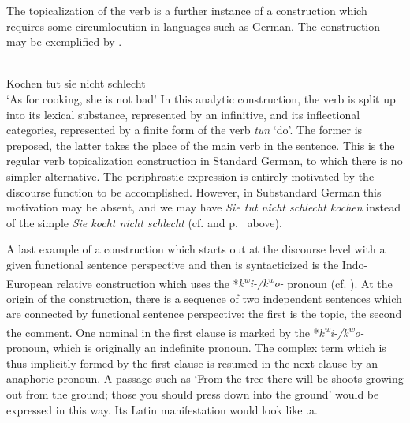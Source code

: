 The topicalization of the verb is a further instance of a construction which requires some circumlocution in languages such as German. The construction may be exemplified by .

\ea \label{ex:E95}
\langinfo{\LangGerm}\\
 Kochen tut sie nicht schlecht\\
\glt ‘As for cooking, she is not bad’
\z
\noindent In this analytic construction, the verb is split up into its lexical substance, represented by an infinitive, and its inflectional categories, represented by a finite form of the verb \textit{tun} ‘do’. The former is preposed, the latter takes the place of the main verb in the sentence. This is the regular verb topicalization construction in Standard German, to which there is no simpler alternative. The periphrastic expression is entirely motivated by the discourse function to be accomplished.\label{page123} However, in Substandard German this motivation may be absent, and we may have \textit{Sie tut nicht schlecht kochen} instead of the simple \textit{Sie kocht nicht schlecht} (cf. \citealt[156]{Ronneberger-Sibold1980} and p.~\pageref{page35}\chk%
  above).

A last example of a construction which starts out at the discourse level with a given functional sentence perspective and then is syntacticized is the Indo-European relative construction which uses the *\textit{k}\textit{\textsuperscript{w}}\textit{i-/k}\textit{\textsuperscript{w}}\textit{o-} pronoun (cf. \citealt[Ch. \textsc{vi}.1]{Lehmann1984}). At the origin of the construction, there is a sequence of two independent sentences which are connected by functional sentence perspective: the first is the topic, the second the comment. One nominal in the first clause is marked by the *\textit{k}\textit{\textsuperscript{w}}\textit{i-/k}\textit{\textsuperscript{w}}\textit{o-} pronoun, which is originally an indefinite pronoun. The complex term which is thus implicitly formed by the first clause  is resumed in the next clause by an anaphoric pronoun. A passage such as ‘From the tree there will be shoots growing out from the ground; those you should press down into the ground’ would be expressed in this way. Its Latin manifestation would look like .a.

